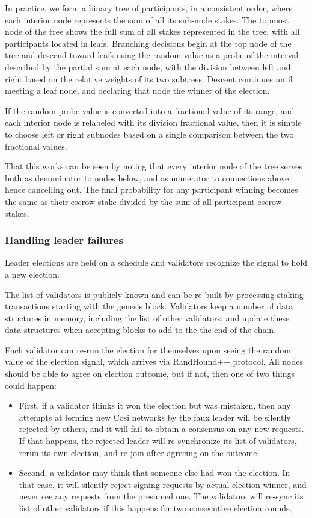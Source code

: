 \documentclass[a4paper, 10pt, conference]{ieeeconf}
\begin{document}
In practice, we form a binary tree of participants, in a consistent order, where each interior node represents the sum of all its sub-node stakes. The topmost node of the tree shows the full sum of all stakes represented in the tree, with all participants located in leafs. Branching decisions begin at the top node of the tree and descend toward leafs using the random value as a probe of the interval described by the partial sum at each node, with the division between left and right based on the relative weights of its two subtrees. Descent continues until meeting a leaf node, and declaring that node the winner of the election. 

If the random probe value is converted into a fractional value of its range, and each interior node is relabeled with its division fractional value, then it is simple to choose left or right subnodes based on a single comparison between the two fractional values.

That this works can be seen by noting that every interior node of the tree serves both as denominator to nodes below, and as numerator to connections above, hence cancelling out. The final probability for any participant winning becomes the same as their escrow stake divided by the sum of all participant escrow stakes.

\subsubsection{Handling leader failures} Leader elections are held on a schedule and validators recognize the signal to hold a new election. 

The list of validators is publicly known and can be re-built by processing staking transactions starting with the genesis block. Validators keep a number of data structures in memory, including the list of other validators, and update these data structures when accepting blocks to add to the the end of the chain.

Each validator can re-run the election for themselves upon seeing the random value of the election signal, which arrives via RandHound++ protocol. All nodes should be able to agree on election outcome, but if not, then one of two things could happen: 

\begin{itemize}
	\item{First, if a validator thinks it won the election but was mistaken, then any attempts at forming new Cosi networks by the faux leader will be silently rejected by others, and it will fail to obtain a consensus on any new requests. If that happens, the rejected leader will re-synchronize its list of validators, rerun its own election, and re-join after agreeing on the outcome.} 
	\item{Second, a validator may think that someone else had won the election. In that case, it will silently reject signing requests by actual election winner, and never see any requests from the presumed one. The validators will re-sync its list of other validators if this happens for two consecutive election rounds.}
\end{itemize}
\end{document}
